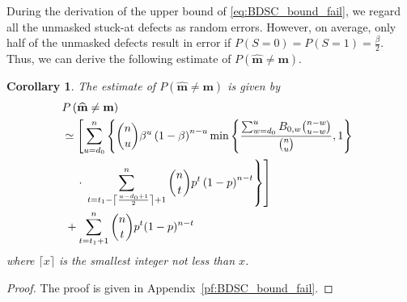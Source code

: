 \documentclass[10pt,twocolumn,twoside,submit]{JCNtran}
\newtheorem{corollary}[theorem]{Corollary}
\begin{document}

	During the derivation of the upper bound of \eqref{eq:BDSC_bound_fail}, we regard all the unmasked stuck-at defects as random errors. However, on average, only half of the unmasked defects result in error if $P(S=0) = P(S = 1) = \frac{\beta}{2}$. Thus, we can derive the following estimate of $P\left( \widehat{\mathbf{m}} \ne \mathbf{m} \right)$. 
	
	\begin{corollary}\label{cor:BDSC_estimate_fail} The estimate of $P\left( \widehat{\mathbf{m}} \ne \mathbf{m} \right)$ is given by
		\begin{align}
		& \hspace{-1mm} P\left( \widehat{\mathbf{m}} \ne \mathbf{m} \right) \nonumber \\
		& \hspace{-1mm} \simeq \left[ \sum_{u=d_0}^{n} \left\{ {\binom{n}{u} \beta^{u} \left( 1 - \beta \right)^{n-u}} \min\left\{ \frac{\sum_{w=d_0}^{u}{B_{0,w} \binom{n-w}{u-w}}}{\binom{n}{u}} , 1 \right\} \right.\right. \nonumber \\
		& \quad \cdot \left.\left. \sum_{t=t_1 - \left\lceil \frac{u - d_0 + 1}{2} \right\rceil + 1 }^{n}{\binom{n}{t} p^{t} \left( 1 - p \right)^{n-t}} \right\} \right]\nonumber \\
		& + \sum_{t=t_1 + 1}^{n}{\binom{n}{t}p^t (1-p)^{n-t}} \label{eq:BDSC_estimate_fail}
		\end{align}
		where $\lceil x \rceil$ is the smallest integer not less than $x$.
	\end{corollary}
	\begin{proof}
	The proof is given in Appendix~\ref{pf:BDSC_bound_fail}. 
	\end{proof}
	
\end{document}
